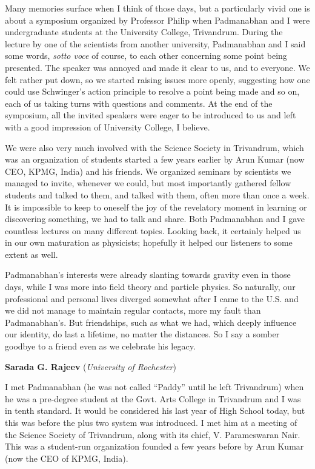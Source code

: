 \documentclass[prd, preprint, longbibliography, 11pt]{revtex4-1}
\begin{document}
Many memories surface when I think of those days, but a particularly vivid one is about a symposium organized by Professor Philip when Padmanabhan and I were undergraduate students at the University College, Trivandrum. During the lecture by one of the scientists from another university, Padmanabhan and I said some words, {\it sotto voce} of course, to each other concerning some point being presented. The speaker was annoyed and made it clear to us, and to everyone. We felt rather put down, so we started raising issues more openly, suggesting how one could use Schwinger’s action principle to resolve a point being made and so on, each of us taking turns with questions and comments. At the end of the symposium, all the invited speakers were eager to be introduced to us and left with a good impression of University College, I believe.

We were also very much involved with the Science Society in Trivandrum, which was an organization of students started a few years earlier by Arun Kumar (now CEO, KPMG, India) 
and his friends. We organized seminars by scientists we managed to invite, whenever we could, but most importantly gathered fellow students and talked to them, and talked with them, often more than once a week. It is impossible to keep to oneself the joy of the revelatory moment in learning or discovering something, we had to talk and share. Both Padmanabhan and I gave countless lectures on many different topics. Looking back, it certainly helped us in our own maturation as physicists; hopefully it helped our listeners to some extent as well. 

Padmanabhan’s interests were already slanting towards gravity even in those days, while I was more into field theory and particle physics. So naturally, our professional and personal lives diverged somewhat after I came to the U.S. and we did not manage to maintain regular contacts, more my fault than Padmanabhan’s. But friendships, such as what we had, which deeply influence our identity, do last a lifetime, no matter the distances. So I say a somber goodbye to a friend even as we celebrate his legacy.

\newpage

\centerline{{\bf Sarada  G. Rajeev} ({\it University of Rochester}) }
\medskip
{}

\noindent I met Padmanabhan (he was not called “Paddy” until he left Trivandrum) when he was a pre-degree student at the Govt. Arts College in Trivandrum and I was in tenth standard. It would be considered his last year of High School today, but this was before the plus two system was introduced. I met him at a meeting of the Science Society of Trivandrum, along with its chief, V. Parameswaran Nair. This was a student-run organization founded a few years before by Arun Kumar (now the CEO of KPMG, India).
\end{document}
